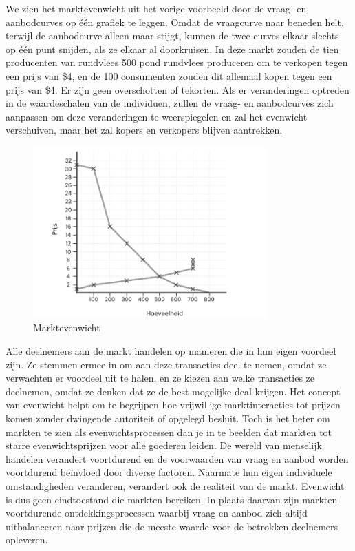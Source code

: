 We zien het marktevenwicht uit het vorige voorbeeld door de vraag- en aanbodcurves op één grafiek te leggen. Omdat de vraagcurve naar beneden helt, terwijl de aanbodcurve alleen maar stijgt, kunnen de twee curves elkaar slechts op één punt snijden, als ze elkaar al doorkruisen. In deze markt zouden de tien producenten van rundvlees 500 pond rundvlees produceren om te verkopen tegen een prijs van \$4, en de 100 consumenten zouden dit allemaal kopen tegen een prijs van \$4. Er zijn geen overschotten of tekorten. Als er veranderingen optreden in de waardeschalen van de individuen, zullen de vraag- en aanbodcurves zich aanpassen om deze veranderingen te weerspiegelen en zal het evenwicht verschuiven, maar het zal kopers en verkopers blijven aantrekken.

\begin{figure}
\centering
    \includegraphics[width=0.8\textwidth]{figures/fig26-1.png}
    \caption[Marktevenwicht]{Marktevenwicht}
    \label{fig26}
\end{figure}

Alle deelnemers aan de markt handelen op manieren die in hun eigen voordeel zijn. Ze stemmen ermee in om aan deze transacties deel te nemen, omdat ze verwachten er voordeel uit te halen, en ze kiezen aan welke transacties ze deelnemen, omdat ze denken dat ze de best mogelijke deal krijgen. Het concept van evenwicht helpt om te begrijpen hoe vrijwillige marktinteracties tot prijzen komen zonder dwingende autoriteit of opgelegd besluit. Toch is het beter om markten te zien als evenwichtsprocessen dan je in te beelden dat markten tot starre evenwichtsprijzen voor alle goederen leiden. De wereld van menselijk handelen verandert voortdurend en de voorwaarden van vraag en aanbod worden voortdurend beïnvloed door diverse factoren. Naarmate hun eigen individuele omstandigheden veranderen, verandert ook de realiteit van de markt. Evenwicht is dus geen eindtoestand die markten bereiken. In plaats daarvan zijn markten voortdurende ontdekkingsprocessen waarbij vraag en aanbod zich altijd uitbalanceren naar prijzen die de meeste waarde voor de betrokken deelnemers opleveren.

